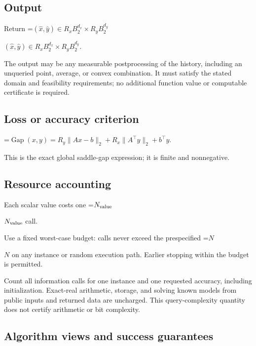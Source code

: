 \documentclass[10pt,a4paper]{article}
\newcommand{\AtlasMath}[1]{\par\begingroup\centering\setbox0=\hbox{$\displaystyle #1$}\ifdim\wd0>1.4\linewidth\typeout{ATLAS WIDE FORMULA: \the\wd0}\fi\ifdim\wd0>\linewidth\resizebox{\linewidth}{!}{\box0}\else\box0\fi\par\endgroup}
\newcommand{\AtlasInlineMath}[1]{\begingroup\setbox0=\hbox{$#1$}\ifdim\wd0>.4\linewidth\endgroup\AtlasMath{#1}\else\endgroup$#1$\fi}
\begin{document}
\subsection{Output}


Return \AtlasInlineMath{(\widehat{x},\widehat{y})\in R_xB_2^{d_x}\times R_yB_2^{d_y}}.



The output may be any measurable postprocessing of the history, including an unqueried point, average, or convex combination. It must satisfy the stated domain and feasibility requirements; no additional function value or computable certificate is required.



\subsection{Loss or accuracy criterion}



\AtlasMath{\operatorname{Gap}(x,y)=R_y\|Ax-b\|_2+R_x\|A^\top y\|_2+b^\top y.}




This is the exact global saddle-gap expression; it is finite and nonnegative.



\subsection{Resource accounting}


Each scalar value costs one \AtlasInlineMath{N_{\rm value}} call.



Use a fixed worst-case budget: calls never exceed the prespecified \AtlasInlineMath{N} on any instance or random execution path. Earlier stopping within the budget is permitted.



Count all information calls for one instance and one requested accuracy, including initialization. Exact-real arithmetic, storage, and solving known models from public inputs and returned data are uncharged. This query-complexity quantity does not certify arithmetic or bit complexity.



\subsection{Algorithm views and success guarantees}
\end{document}
